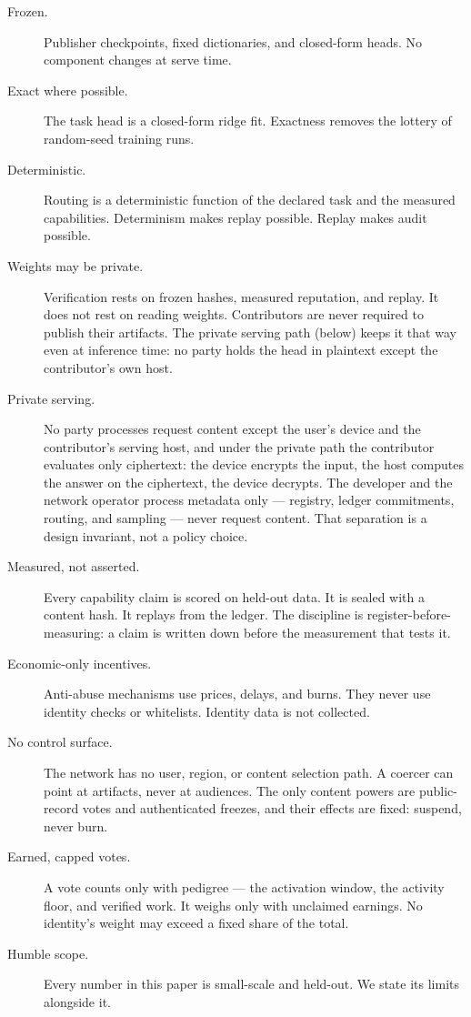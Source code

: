 \documentclass[11pt]{article}
\begin{document}
\begin{description}
\item[Frozen.] Publisher checkpoints, fixed dictionaries, and
closed-form heads. No component changes at serve time.
\item[Exact where possible.] The task head is a closed-form ridge
fit. Exactness removes the lottery of random-seed training runs.
\item[Deterministic.] Routing is a deterministic function of the
declared task and the measured capabilities. Determinism makes
replay possible. Replay makes audit possible.
\item[Weights may be private.] Verification rests on frozen
hashes, measured reputation, and replay. It does not rest on
reading weights. Contributors are never required to publish their
artifacts. The private serving path (below) keeps it that way even
at inference time: no party holds the head in plaintext except the
contributor's own host.
\item[Private serving.] No party processes request content except
the user's device and the contributor's serving host, and under
the private path the contributor evaluates only ciphertext: the
device encrypts the input, the host computes the answer on the
ciphertext, the device decrypts. The developer and the network
operator process metadata only --- registry, ledger commitments,
routing, and sampling --- never request content. That separation
is a design invariant, not a policy choice.
\item[Measured, not asserted.] Every capability claim is scored
on held-out data. It is sealed with a content hash. It replays
from the ledger. The discipline is register-before-measuring: a
claim is written down before the measurement that tests it.
\item[Economic-only incentives.] Anti-abuse mechanisms use
prices, delays, and burns. They never use identity checks or
whitelists. Identity data is not collected.
\item[No control surface.] The network has no user, region, or
content selection path. A coercer can point at artifacts, never
at audiences. The only content powers are public-record votes
and authenticated freezes, and their effects are fixed:
suspend, never burn.
\item[Earned, capped votes.] A vote counts only with pedigree ---
the activation window, the activity floor, and verified work. It
weighs only with unclaimed earnings. No identity's weight may
exceed a fixed share of the total.
\item[Humble scope.] Every number in this paper is small-scale
and held-out. We state its limits alongside it.
\end{description}
\end{document}
